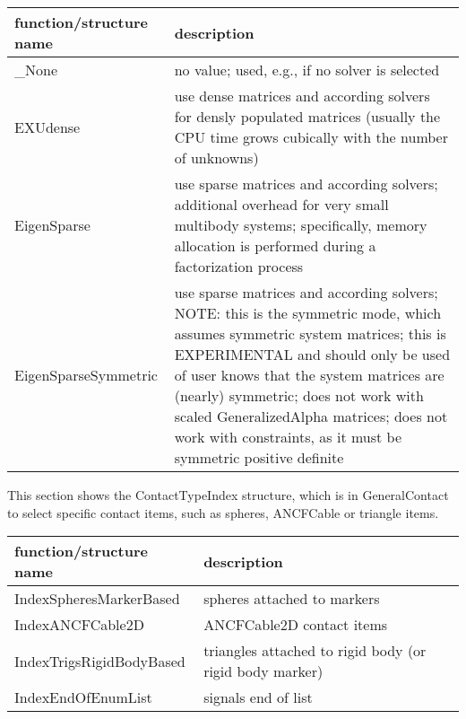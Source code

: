 \begin{center}
\footnotesize
\begin{longtable}{| p{8cm} | p{8cm} |} 
\hline
{\bf function/structure name} & {\bf description}\\ \hline
  \_None & no value; used, e.g., if no solver is selected\\ \hline  
  EXUdense & use dense matrices and according solvers for densly populated matrices (usually the CPU time grows cubically with the number of unknowns)\\ \hline  
  EigenSparse & use sparse matrices and according solvers; additional overhead for very small multibody systems; specifically, memory allocation is performed during a factorization process\\ \hline  
  EigenSparseSymmetric & use sparse matrices and according solvers; NOTE: this is the symmetric mode, which assumes symmetric system matrices; this is EXPERIMENTAL and should only be used of user knows that the system matrices are (nearly) symmetric; does not work with scaled GeneralizedAlpha matrices; does not work with constraints, as it must be symmetric positive definite\\ \hline  
\end{longtable}
\end{center}

\label{sec:ContactTypeIndex}
This section shows the ContactTypeIndex structure, which is in GeneralContact to select specific contact items, such as spheres, ANCFCable or triangle items.



\begin{center}
\footnotesize
\begin{longtable}{| p{8cm} | p{8cm} |} 
\hline
{\bf function/structure name} & {\bf description}\\ \hline
  IndexSpheresMarkerBased & spheres attached to markers\\ \hline  
  IndexANCFCable2D & ANCFCable2D contact items\\ \hline  
  IndexTrigsRigidBodyBased & triangles attached to rigid body (or rigid body marker)\\ \hline  
  IndexEndOfEnumList & signals end of list\\ \hline  
\end{longtable}
\end{center}

